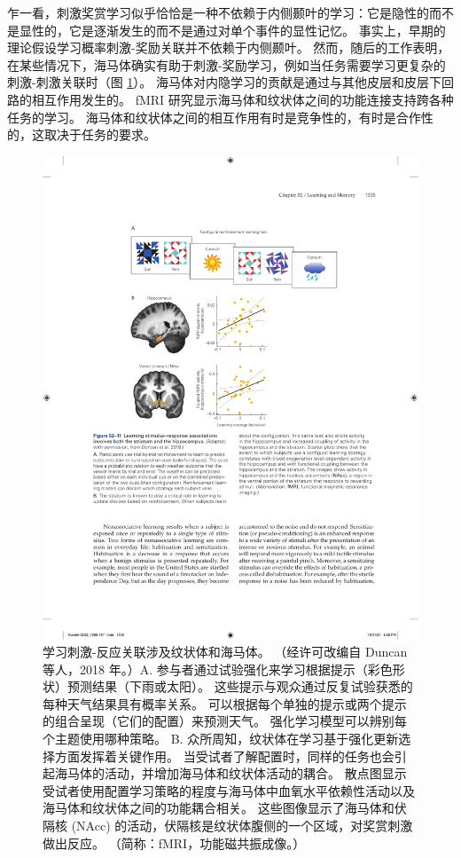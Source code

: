 乍一看，刺激奖赏学习似乎恰恰是一种不依赖于内侧颞叶的学习：它是隐性的而不是显性的，它是逐渐发生的而不是通过对单个事件的显性记忆。 事实上，早期的理论假设学习概率刺激-奖励关联并不依赖于内侧颞叶。 然而，随后的工作表明，在某些情况下，海马体确实有助于刺激-奖励学习，例如当任务需要学习更复杂的刺激-刺激关联时（图 \ref{fig:52_11}）。 海马体对内隐学习的贡献是通过与其他皮层和皮层下回路的相互作用发生的。 fMRI 研究显示海马体和纹状体之间的功能连接支持跨各种任务的学习。 海马体和纹状体之间的相互作用有时是竞争性的，有时是合作性的，这取决于任务的要求。

\begin{figure}[htbp]
	\centering
	\includegraphics[width=0.75\linewidth]{chap52/fig_52_11}
	\caption{学习刺激-反应关联涉及纹状体和海马体。 （经许可改编自 Duncan 等人，2018 年。）A. 参与者通过试验强化来学习根据提示（彩色形状）预测结果（下雨或太阳）。 这些提示与观众通过反复试验获悉的每种天气结果具有概率关系。 可以根据每个单独的提示或两个提示的组合呈现（它们的配置）来预测天气。 强化学习模型可以辨别每个主题使用哪种策略。 B. 众所周知，纹状体在学习基于强化更新选择方面发挥着关键作用。 当受试者了解配置时，同样的任务也会引起海马体的活动，并增加海马体和纹状体活动的耦合。 散点图显示受试者使用配置学习策略的程度与海马体中血氧水平依赖性活动以及海马体和纹状体之间的功能耦合相关。 这些图像显示了海马体和伏隔核 (NAcc) 的活动，伏隔核是纹状体腹侧的一个区域，对奖赏刺激做出反应。 （简称：fMRI，功能磁共振成像。）}
	\label{fig:52_11}
\end{figure}

